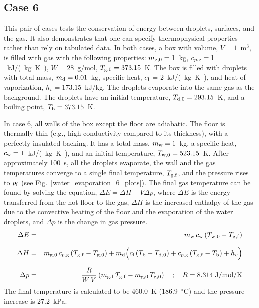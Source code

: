 \documentclass[11pt]{book}
\begin{document}
\FloatBarrier

\subsection{Case 6}
\label{water_evaporation_6}

This pair of cases tests the conservation of energy between droplets, surfaces, and the gas. It also demonstrates that one can specify thermophysical properties rather than rely on tabulated data. In both cases, a box with volume, $V=1$~m$^3$, is filled with gas with the following properties: $m_{\rm g,0}=1$~kg, $c_{p,\rm g}=1$~\si{kJ/(kg.K)}, $W=28$~g/mol, $T_{{\rm g},0}=373.15$~K.  The box is filled with droplets with total mass, $m_{\rm d}=0.01$~kg, specific heat, $c_{\rm l}$ = 2~\si{kJ/(kg.K)}, and heat of vaporization, $h_v=173.15$~kJ/kg. The droplets evaporate into the same gas as the background.  The droplets have an initial temperature, $T_{\rm d,0}=293.15$~K, and a boiling point, $T_{\rm b}=373.15$~K.

In case 6, all walls of the box except the floor are adiabatic.  The floor is thermally thin (e.g., high conductivity compared to its thickness), with a perfectly insulated backing. It has a total mass, $m_{\rm w}=1$~kg, a specific heat, $c_{\rm w}=1$~\si{kJ/(kg.K)}, and an initial temperature, $T_{\rm w,0}=523.15$~K.  After approximately 100~s, all the droplets evaporate, the wall and the gas temperatures converge to a single final temperature, $T_{\rm g,f}$, and the pressure rises to $p_{\rm f}$ (see Fig.~\ref{water_evaporation_6_plots}). The final gas temperature can be found by solving the equation, $\Delta E = \Delta H - V \Delta p$, where $\Delta E$ is the energy transferred from the hot floor to the gas, $\Delta H$ is the increased enthalpy of the gas due to the convective heating of the floor and the evaporation of the water droplets, and $\Delta p$ is the change in gas pressure.
\begin{eqnarray*}
\Delta E &=& m_{\rm w} \, c_{\rm w} \, (T_{{\rm w},0}-T_{\rm g,f}) \\[.1in]
\Delta H &=& m_{\rm g,0} \, c_{p,{\rm g}} \, (T_{\rm g,f}-T_{\rm g,0} ) + m_{\rm d} \Big( c_{\rm l} \, (T_{\rm b}-T_{\rm d,0}) + c_{p,{\rm g}} \, (T_{\rm g,f}-T_{\rm b}) + h_v  \Big) \\[.1in]
\Delta p &=& \frac{R}{W \, V} \left( m_{\rm g,f} \, T_{\rm g,f} - m_{\rm g,0} \, T_{\rm g,0} \right) \quad ; \quad R = 8.314 \; \hbox{J/mol/K}
\end{eqnarray*}
The final temperature is calculated to be 460.0~K (186.9~$^\circ$C) and the pressure increase is 27.2~kPa.
\end{document}
